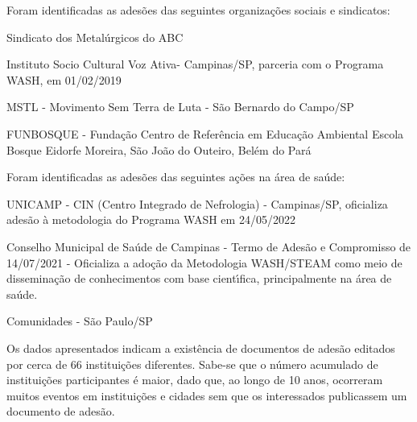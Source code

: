 \documentclass[
12pt,		%
openright,	%
twoside,  %
a4paper,			%
chapter=TITLE,		%
english,			%
french,				%
spanish,			%
brazil				%
]{USPSC-classe/USPSC}
\begin{document}
Foram identificadas as ades\~oes das seguintes organiza\c{c}\~oes sociais e sindicatos:











\begin{alineas}
\item Sindicato dos Metal\'urgicos do ABC
\item Instituto Socio Cultural Voz Ativa- Campinas/SP,  parceria com o Programa WASH, em 01/02/2019
\item MSTL - Movimento Sem Terra de Luta - S\~ao Bernardo do Campo/SP
\item FUNBOSQUE - Funda\c{c}\~ao Centro de Refer\^encia em Educa\c{c}\~ao Ambiental Escola Bosque Eidorfe Moreira, S\~ao Jo\~ao do Outeiro, Bel\'em do Par\'a
\end{alineas}

Foram identificadas as ades\~oes das seguintes a\c{c}\~oes na \'area de sa\'ude:











\begin{alineas}
\item UNICAMP - CIN (Centro Integrado de Nefrologia) - Campinas/SP, oficializa ades\~ao \`a metodologia do Programa WASH em 24/05/2022
\item Conselho Municipal de  Sa\'ude de Campinas - Termo de Ades\~ao e Compromisso de 14/07/2021 - Oficializa a ado\c{c}\~ao da Metodologia WASH/STEAM como meio de dissemina\c{c}\~ao de conhecimentos com base cient\'{\i}fica, principalmente na \'area de sa\'ude.
\item Comunidades - S\~ao Paulo/SP
\end{alineas}

Os dados apresentados indicam a exist\^encia de documentos de ades\~ao editados por cerca de 66 institui\c{c}\~oes diferentes. Sabe-se que o n\'umero acumulado de institui\c{c}\~oes participantes \'e maior, dado que, ao longo de 10 anos, ocorreram muitos eventos em institui\c{c}\~oes e cidades sem que os interessados publicassem um documento de ades\~ao.
\end{document}
